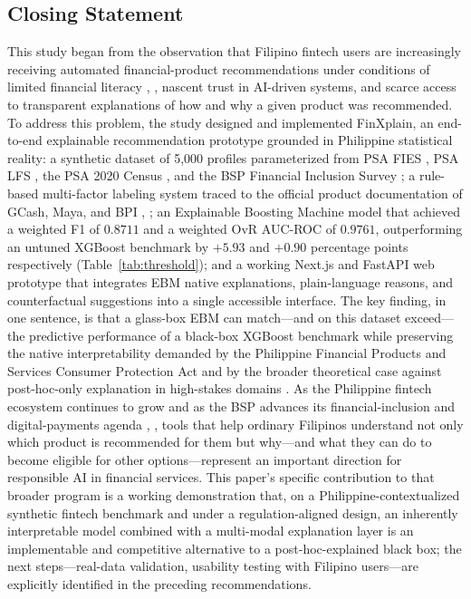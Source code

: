 \documentclass{icsthesis}
\begin{document}
\begin{mainmatter}
			\subsection{Closing Statement}
				This study began from the observation that Filipino fintech users are increasingly receiving automated financial-product recommendations under conditions of limited financial literacy \cite{ref4}, \cite{ref43}, nascent trust in AI-driven systems, and scarce access to transparent explanations of how and why a given product was recommended. To address this problem, the study designed and implemented FinXplain, an end-to-end explainable recommendation prototype grounded in Philippine statistical reality: a synthetic dataset of 5{,}000 profiles parameterized from PSA FIES \cite{ref40}, PSA LFS \cite{ref41}, the PSA 2020 Census \cite{ref39}, and the BSP Financial Inclusion Survey \cite{ref35}; a rule-based multi-factor labeling system traced to the official product documentation of GCash, Maya, and BPI \cite{ref6}, \cite{ref37}; an Explainable Boosting Machine model that achieved a weighted F1 of $0.8711$ and a weighted OvR AUC-ROC of $0.9761$, outperforming an untuned XGBoost benchmark by $+5.93$ and $+0.90$ percentage points respectively (Table~\ref{tab:threshold}); and a working Next.js and FastAPI web prototype that integrates EBM native explanations, plain-language reasons, and counterfactual suggestions into a single accessible interface. The key finding, in one sentence, is that a glass-box EBM can match---and on this dataset exceed---the predictive performance of a black-box XGBoost benchmark while preserving the native interpretability demanded by the Philippine Financial Products and Services Consumer Protection Act \cite{ref44} and by the broader theoretical case against post-hoc-only explanation in high-stakes domains \cite{ref51}. As the Philippine fintech ecosystem continues to grow and as the BSP advances its financial-inclusion and digital-payments agenda \cite{ref35}, \cite{ref75}, tools that help ordinary Filipinos understand not only which product is recommended for them but why---and what they can do to become eligible for other options---represent an important direction for responsible AI in financial services. This paper's specific contribution to that broader program is a working demonstration that, on a Philippine-contextualized synthetic fintech benchmark and under a regulation-aligned design, an inherently interpretable model combined with a multi-modal explanation layer is an implementable and competitive alternative to a post-hoc-explained black box; the next steps---real-data validation, usability testing with Filipino users---are explicitly identified in the preceding recommendations.

			
	\end{mainmatter}
\end{document}
